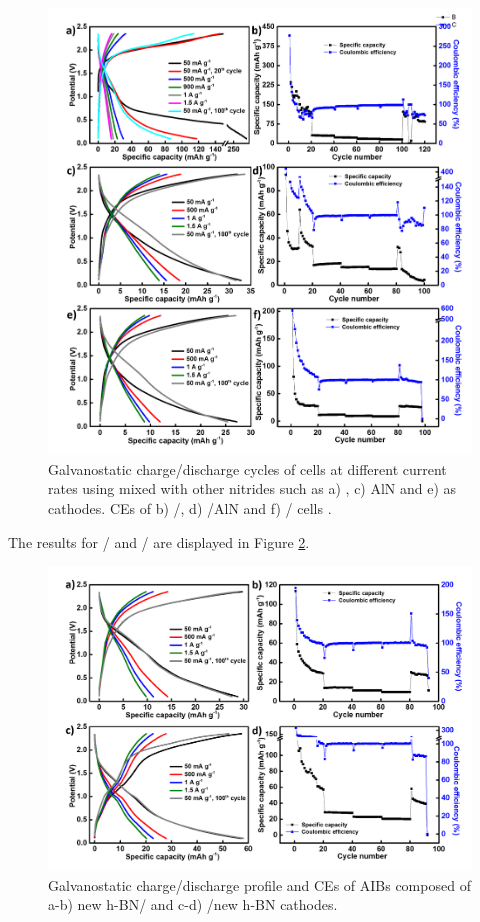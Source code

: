 \begin{figure}[tbh!]
\centering
\includegraphics[width=\textwidth]{Figures/BOhBN/Bonit}
\caption{Galvanostatic charge/discharge cycles of cells at different current rates using  mixed with other nitrides such as a) , c) AlN and e)  as cathodes. CEs of b) /, d) /AlN and f) / cells .}
\label{Figures/BOhBN:Bonit}
\end{figure}

The results for / and / are displayed in Figure \ref{Figures/BOhBN:BNdifO}.

\begin{figure}[tbh!]
\centering
\includegraphics[width=\textwidth]{Figures/BOhBN/BNdifO}
\caption{Galvanostatic charge/discharge profile and CEs of AIBs composed of a-b) new h-BN/ and c-d) /new h-BN cathodes.}
\label{Figures/BOhBN:BNdifO}
\end{figure}

